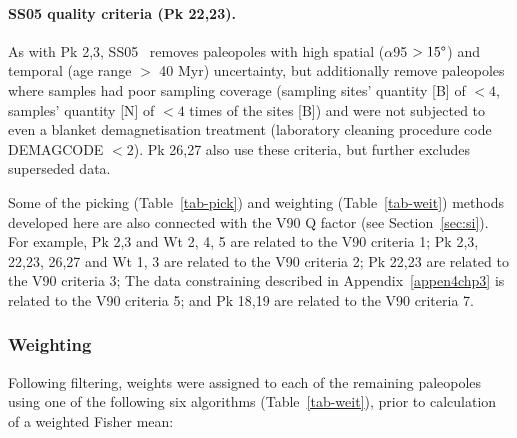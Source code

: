 \paragraph{SS05 quality criteria (Pk 22,23).}\label{subp:ss05} As with Pk 2,3,
SS05~\citep{S05} removes paleopoles with high spatial ($\alpha$95 $>15\degree$)
and temporal (age range $>$ 40 Myr) uncertainty, but additionally remove
paleopoles where samples had poor sampling coverage (sampling sites' quantity
[B] of $<4$, samples' quantity [N] of $<4$ times of the sites [B]) and were not
subjected to even a blanket demagnetisation treatment (laboratory cleaning
procedure code DEMAGCODE $<2$). Pk 26,27 also use these criteria, but
further excludes superseded data.

\bigskip
Some of the picking (Table~\ref{tab-pick}) and weighting (Table~\ref{tab-weit})
methods developed here are also connected with the V90 Q factor (see
Section~\ref{sec:si}). For example, Pk 2,3 and Wt 2, 4, 5 are related to the V90
criteria 1; Pk 2,3, 22,23, 26,27 and Wt 1, 3 are related to the V90 criteria 2;
Pk 22,23 are related to the V90 criteria 3; The data constraining described in
Appendix~\ref{appen4chp3} is related to the V90 criteria 5; and Pk 18,19 are
related to the V90 criteria 7.

\subsubsection{Weighting}\label{sec:w}

Following filtering, weights were assigned to each of the remaining paleopoles
using one of the following six algorithms (Table~\ref{tab-weit}), prior to
calculation of a weighted Fisher mean:

